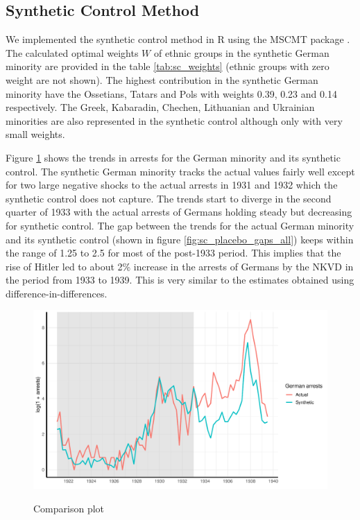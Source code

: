 \subsection{Synthetic Control Method}
We implemented the synthetic control method in R  using the MSCMT package \citep{becker_fast_2018}. The calculated optimal weights $W$ of ethnic groups in the synthetic German minority are provided in the table \ref{tab:sc_weights} (ethnic groups with zero weight are not shown). The highest contribution in the synthetic German minority have the Ossetians, Tatars and Pols with weights 0.39, 0.23 and 0.14 respectively. The Greek, Kabaradin, Chechen, Lithuanian and Ukrainian minorities are also represented in the synthetic control although only with very small weights. 



Figure \ref{fig_sc_comp_plot} shows the trends in arrests for the German minority and its synthetic control. The synthetic German minority tracks the actual values fairly well except for two large negative shocks to the actual arrests in 1931 and 1932 which the synthetic control does not capture. The trends start to diverge in the second quarter of 1933 with the actual arrests of Germans holding steady but decreasing for synthetic control. 
The gap between the trends for the actual German minority and its synthetic control (shown in figure \ref{fig:sc_placebo_gaps_all}) keeps within the range of 1.25 to 2.5 for most of the post-1933 period. This implies that the rise of Hitler led to about  2\% increase in the arrests of Germans by the NKVD  in the period from 1933 to 1939. This is very similar to the estimates obtained using difference-in-differences. 
\begin{figure}[h]
\centering
\caption{Comparison plot}
\includegraphics[width=\textwidth]{plots/synthetic_control/until_pact/comparison_plot.pdf}
\label{fig_sc_comp_plot}
\end{figure}


